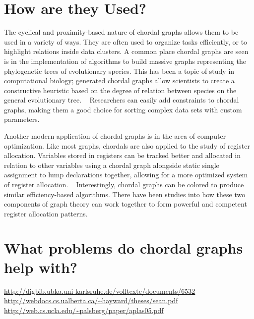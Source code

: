 \section{How are they Used?}
The cyclical and proximity-based nature of chordal graphs allows them to be used in a variety of ways. They are often used to organize
tasks efficiently, or to highlight relations inside data clusters. A common place chordal graphs are seen is in the implementation of algorithms to build
massive graphs representing the phylogenetic trees of evolutionary species. This has been a topic of study in computational biology; generated chordal
graphs allow scientists to create a constructive heuristic based on the degree of relation between species on the general evolutionary tree. ~\cite{kennedy_2005} 
Researchers can easily add constraints to chordal graphs, making them a good choice for sorting complex data sets with custom parameters.\par
Another modern application of chordal graphs is in the area of computer optimization. Like most graphs, chordals are also applied to the study of
register allocation. Variables stored in registers can be tracked better and allocated in relation to other variables using a chordal graph alongside
static single assignment to lump declarations together, allowing for a more optimized system of register allocation. ~\cite{hack_2007} Interestingly, chordal graphs
can be colored to produce similar efficiency-based algorithms. There have been studies into how these two components of graph theory can work together to
form powerful and competent register allocation patterns. \cite{pereira_palsberg}\\

\section{What problems do chordal graphs help with?}



\url{http://digbib.ubka.uni-karlsruhe.de/volltexte/documents/6532}\\
\url{http://webdocs.cs.ualberta.ca/~hayward/theses/sean.pdf}\\
\url{http://web.cs.ucla.edu/~palsberg/paper/aplas05.pdf}



